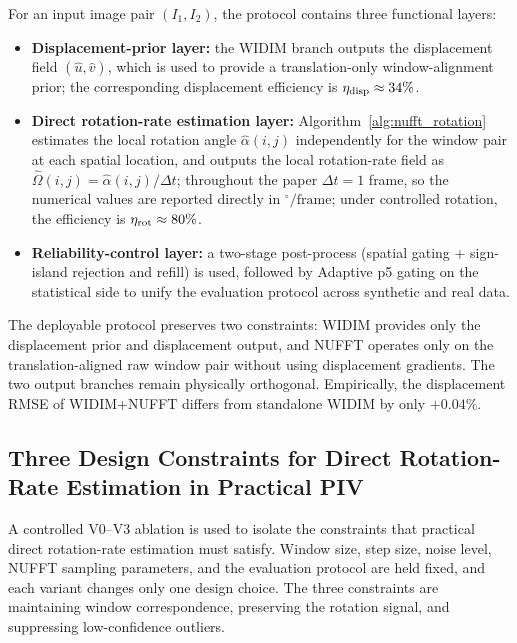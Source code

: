 \documentclass[lettersize,journal]{IEEEtran}
\begin{document}
For an input image pair $(I_1, I_2)$, the protocol contains three functional layers:

\begin{itemize}
  \item \textbf{Displacement-prior layer:}
    the WIDIM branch outputs the displacement field $(\hat{u}, \hat{v})$,
    which is used to provide a translation-only window-alignment prior;
    the corresponding displacement efficiency is $\eta_{\rm disp} \approx 34\%$.
  \item \textbf{Direct rotation-rate estimation layer:}
    Algorithm~\ref{alg:nufft_rotation} estimates the local rotation angle $\hat{\alpha}(i,j)$
    independently for the window pair at each spatial location,
    and outputs the local rotation-rate field as $\hat{\Omega}(i,j)=\hat{\alpha}(i,j)/\Delta t$;
    throughout the paper $\Delta t=1$ frame, so the numerical values are reported directly in $^\circ/\mathrm{frame}$;
    under controlled rotation, the efficiency is $\eta_{\rm rot} \approx 80\%$.
  \item \textbf{Reliability-control layer:}
    a two-stage post-process (spatial gating + sign-island rejection and refill) is used,
    followed by Adaptive p5 gating on the statistical side to unify the evaluation protocol across synthetic and real data.
\end{itemize}

The deployable protocol preserves two constraints:
WIDIM provides only the displacement prior and displacement output,
and NUFFT operates only on the translation-aligned raw window pair without using displacement gradients.
The two output branches remain physically orthogonal.
Empirically, the displacement RMSE of WIDIM+NUFFT differs from standalone WIDIM by only $+0.04\%$.

\subsection{Three Design Constraints for Direct Rotation-Rate Estimation in Practical PIV}
\label{sec:evolution_reason}

A controlled V0--V3 ablation is used to isolate the constraints that practical direct rotation-rate estimation must satisfy.
Window size, step size, noise level, NUFFT sampling parameters, and the evaluation protocol are held fixed, and each variant changes only one design choice.
The three constraints are maintaining window correspondence, preserving the rotation signal, and suppressing low-confidence outliers.
\end{document}
